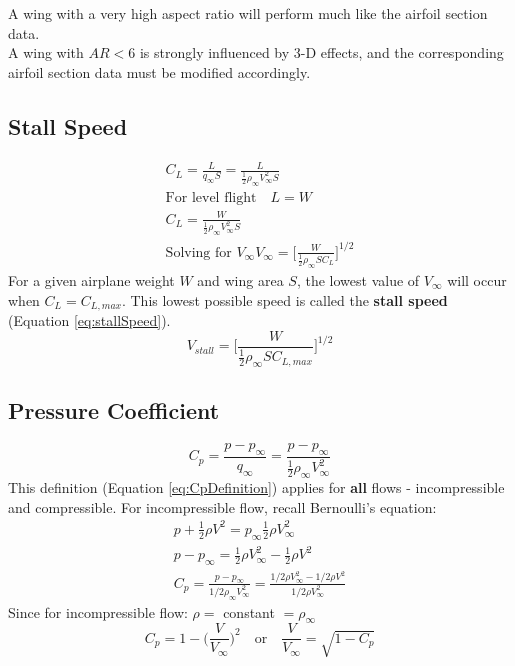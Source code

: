 \documentclass[draft=false, titlepage]{article}
\begin{document}
A wing with a very high aspect ratio will perform much like the airfoil section data.\\
A wing with $AR < 6$ is strongly influenced by 3-D effects, and the corresponding airfoil section data must be modified accordingly.

\subsection{Stall Speed}
\begin{gather*}
C_L = \frac{L}{q_\infty S} = \frac{L}{\frac{1}{2}\rho_\infty V_\infty^2 S}\\\text{For level flight}\quad L=W\\
C_L = \frac{W}{\frac{1}{2}\rho_\infty V_\infty^2 S}\\
\text{Solving for } V_\infty \boxed{V_\infty = \Big[\frac{W}{\frac{1}{2}\rho_\infty S C_L}\Big]^{1/2}}
\end{gather*}
For a given airplane weight $W$ and wing area $S$, the lowest value of $V_\infty$ will occur when $C_L = C_{L,max}$. This lowest possible speed is called the \textbf{stall speed} (Equation \ref{eq:stallSpeed}).
\begin{equation}
V_{stall} = \Big[ \frac{W}{\frac{1}{2}\rho_\infty S C_{L,max}} \Big]^{1/2}
\label{eq:stallSpeed}
\end{equation}

\subsection{Pressure Coefficient}
\begin{equation}
C_p = \frac{p-p_\infty}{q_\infty} = \frac{p-p_\infty}{\frac{1}{2}\rho_\infty V_\infty^2}
\label{eq:CpDefinition}
\end{equation}
This definition (Equation \ref{eq:CpDefinition}) applies for \textbf{all} flows - incompressible and compressible. For incompressible flow, recall Bernoulli's equation:
\begin{gather*}
p + \frac{1}{2}\rho V^2 = p_\infty \frac{1}{2}\rho V_\infty^2\\
p - p_\infty = \frac{1}{2}\rho V_\infty^2 - \frac{1}{2}\rho V^2\\
C_p = \frac{p-p_\infty}{1/2\rho_\infty V_\infty^2} = \frac{1/2 \rho V_\infty^2 - 1/2\rho V^2}{1/2 \rho V_\infty^2}
\end{gather*}
Since for incompressible flow: $\rho = $ constant $ = \rho_\infty$
\begin{equation}
C_p = 1-\Big(\frac{V}{V_\infty}\Big)^2 \quad \text{or} \quad \frac{V}{V_\infty} = \sqrt{1-C_p}
\label{eq:CpIncompressible}
\end{equation}
\end{document}
